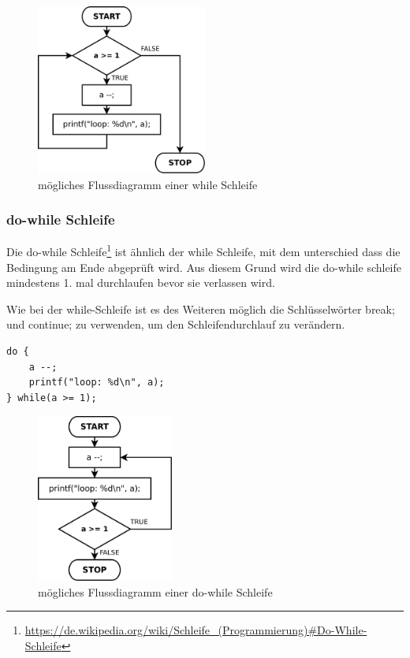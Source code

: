\begin{figure}[h]
\centering
\includegraphics[width=0.5\textwidth]{./media/images/compiler/language_specification_while.png}
\caption{m\"ogliches Flussdiagramm einer while Schleife}
\label{language_specification_while}
\end{figure}

\newpage
\subsubsection{do-while Schleife}

Die do-while Schleife\footnote{\url{https://de.wikipedia.org/wiki/Schleife_(Programmierung)\#Do-While-Schleife}} ist \"ahnlich der while Schleife, mit dem unterschied dass die Bedingung am Ende abgepr\"uft wird. Aus diesem Grund wird die do-while schleife mindestens 1. mal durchlaufen bevor sie verlassen wird.

Wie bei der while-Schleife ist es des Weiteren m\"oglich die Schl\"usselw\"orter break; und continue; zu verwenden, um den Schleifendurchlauf zu ver\"andern.


\begin{lstlisting}[language=CMM]
do {
	a --;
	printf("loop: %d\n", a);
} while(a >= 1);
\end{lstlisting}

\begin{figure}[h]
\centering
\includegraphics[width=0.4\textwidth]{./media/images/compiler/language_specification_do_while.png}
\caption{m\"ogliches Flussdiagramm einer do-while Schleife}
\label{language_specification_do_while}
\end{figure}

